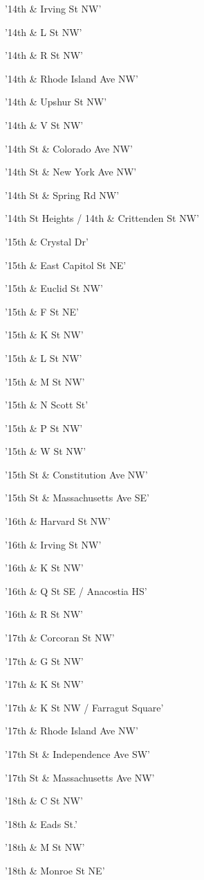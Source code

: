 \documentclass[11pt]{article}
\begin{document}
\begin{enumerate*}
\item '14th \& Irving St NW'
\item '14th \& L St NW'
\item '14th \& R St NW'
\item '14th \& Rhode Island Ave NW'
\item '14th \& Upshur St NW'
\item '14th \& V St NW'
\item '14th St \& Colorado Ave NW'
\item '14th St \& New York Ave NW'
\item '14th St \& Spring Rd NW'
\item '14th St Heights / 14th \& Crittenden St NW'
\item '15th \& Crystal Dr'
\item '15th \& East Capitol St NE'
\item '15th \& Euclid St  NW'
\item '15th \& F St NE'
\item '15th \& K St NW'
\item '15th \& L St NW'
\item '15th \& M St NW'
\item '15th \& N Scott St'
\item '15th \& P St NW'
\item '15th \& W St NW'
\item '15th St \& Constitution Ave NW'
\item '15th St \& Massachusetts Ave SE'
\item '16th \& Harvard St NW'
\item '16th \& Irving St NW'
\item '16th \& K St NW'
\item '16th \& Q St SE / Anacostia HS'
\item '16th \& R St NW'
\item '17th \& Corcoran St NW'
\item '17th \& G St NW'
\item '17th \& K St NW'
\item '17th \& K St NW / Farragut Square'
\item '17th \& Rhode Island Ave NW'
\item '17th St \& Independence Ave SW'
\item '17th St \& Massachusetts Ave NW'
\item '18th \& C St NW'
\item '18th \& Eads St.'
\item '18th \& M St NW'
\item '18th \& Monroe St NE'

\end{enumerate*}
\end{document}
